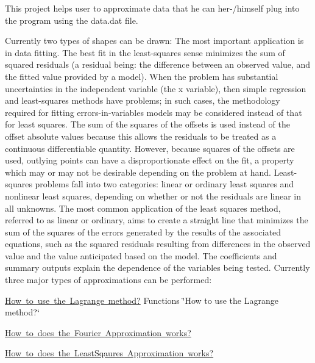 This project helps user to approximate data that he can her-\//himself plug into the program using the data.\+dat file.

Currently two types of shapes can be drawn\+: The most important application is in data fitting. The best fit in the least-\/squares sense minimizes the sum of squared residuals (a residual being\+: the difference between an observed value, and the fitted value provided by a model). When the problem has substantial uncertainties in the independent variable (the x variable), then simple regression and least-\/squares methods have problems; in such cases, the methodology required for fitting errors-\/in-\/variables models may be considered instead of that for least squares. The sum of the squares of the offsets is used instead of the offset absolute values because this allows the residuals to be treated as a continuous differentiable quantity. However, because squares of the offsets are used, outlying points can have a disproportionate effect on the fit, a property which may or may not be desirable depending on the problem at hand. Least-\/squares problems fall into two categories\+: linear or ordinary least squares and nonlinear least squares, depending on whether or not the residuals are linear in all unknowns. The most common application of the least squares method, referred to as linear or ordinary, aims to create a straight line that minimizes the sum of the squares of the errors generated by the results of the associated equations, such as the squared residuals resulting from differences in the observed value and the value anticipated based on the model. The coefficients and summary outputs explain the dependence of the variables being tested. Currently three major types of approximations can be performed\+:


\begin{DoxyItemize}
\item \mbox{\hyperlink{LagrangePolynomial}{How to use the Lagrange method?}} Functions \char`\"{}\+How to use the Lagrange method?\char`\"{}
\item \mbox{\hyperlink{FourierTransforms}{How to does the Fourier Approximation works?}}
\item \mbox{\hyperlink{LeastSquares}{How to does the Least\+Sqaures Approximation works?}} 
\end{DoxyItemize}